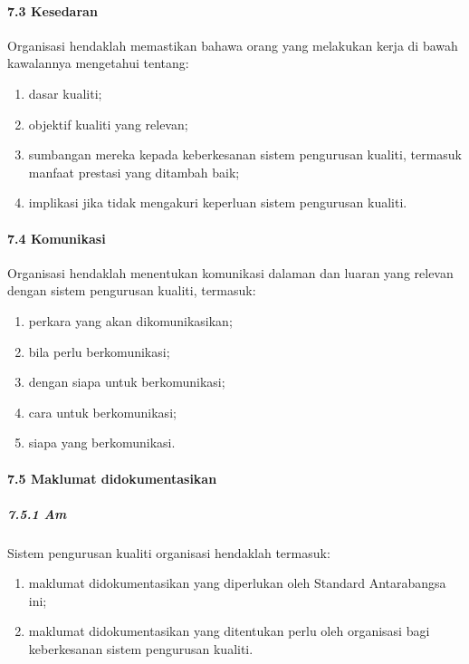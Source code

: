 \documentclass[
]{article}
\begin{document}
\hypertarget{kesedaran}{%
\paragraph{7.3 Kesedaran}\label{kesedaran}}

Organisasi hendaklah memastikan bahawa orang yang melakukan kerja di
bawah kawalannya mengetahui tentang:

\begin{enumerate}
\def\labelenumi{\alph{enumi})}
\item
  dasar kualiti;
\item
  objektif kualiti yang relevan;
\item
  sumbangan mereka kepada keberkesanan sistem pengurusan kualiti,
  termasuk manfaat prestasi yang ditambah baik;
\item
  implikasi jika tidak mengakuri keperluan sistem pengurusan kualiti.
\end{enumerate}

\hypertarget{komunikasi}{%
\paragraph{7.4 Komunikasi}\label{komunikasi}}

Organisasi hendaklah menentukan komunikasi dalaman dan luaran yang
relevan dengan sistem pengurusan kualiti, termasuk:

\begin{enumerate}
\def\labelenumi{\alph{enumi})}
\item
  perkara yang akan dikomunikasikan;
\item
  bila perlu berkomunikasi;
\item
  dengan siapa untuk berkomunikasi;
\item
  cara untuk berkomunikasi;
\item
  siapa yang berkomunikasi.
\end{enumerate}

\hypertarget{maklumat-didokumentasikan}{%
\paragraph{7.5 Maklumat
didokumentasikan}\label{maklumat-didokumentasikan}}

\hypertarget{am-4}{%
\subparagraph{7.5.1 Am}\label{am-4}}

Sistem pengurusan kualiti organisasi hendaklah termasuk:

\begin{enumerate}
\def\labelenumi{\alph{enumi})}
\item
  maklumat didokumentasikan yang diperlukan oleh Standard Antarabangsa
  ini;
\item
  maklumat didokumentasikan yang ditentukan perlu oleh organisasi bagi
  keberkesanan sistem pengurusan kualiti.
\end{enumerate}
\end{document}
